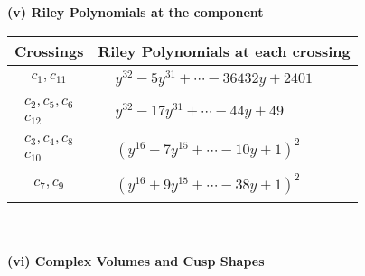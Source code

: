 \documentclass[1p]{elsarticle_modified}
\theoremstyle{definition}
\begin{document}
\newpage\renewcommand{\arraystretch}{1}
\flushleft \textbf{(v) Riley Polynomials at the component}\newline \\
\begin{tabular}{m{50pt}|m{274pt}}
Crossings & \hspace{64pt}Riley Polynomials at each crossing \\
\hline $$\begin{aligned}c_{1},c_{11}\end{aligned}$$&$\begin{aligned}
&y^{32}-5 y^{31}+\cdots-36432 y+2401
\end{aligned}$\\
\hline $$\begin{aligned}c_{2},c_{5},c_{6}\\c_{12}\end{aligned}$$&$\begin{aligned}
&y^{32}-17 y^{31}+\cdots-44 y+49
\end{aligned}$\\
\hline $$\begin{aligned}c_{3},c_{4},c_{8}\\c_{10}\end{aligned}$$&$\begin{aligned}
&(y^{16}-7 y^{15}+\cdots-10 y+1)^{2}
\end{aligned}$\\
\hline $$\begin{aligned}c_{7},c_{9}\end{aligned}$$&$\begin{aligned}
&(y^{16}+9 y^{15}+\cdots-38 y+1)^{2}
\end{aligned}$\\
\hline
\end{tabular}\\~\\
\newpage\flushleft \textbf{(vi) Complex Volumes and Cusp Shapes}
\end{document}
